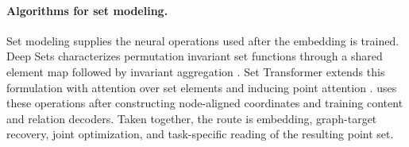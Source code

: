\paragraph{Algorithms for set modeling.}
Set modeling supplies the neural operations used after the embedding is trained.
Deep Sets characterizes permutation invariant set functions through a shared
element map followed by invariant aggregation \cite{zaheer2017}.  Set
Transformer extends this formulation with attention over set elements and
inducing point attention \cite{lee2019}.  \method{} uses these operations after
constructing node-aligned coordinates and training content and relation
decoders.  Taken together, the route is embedding, graph-target recovery,
joint optimization, and task-specific reading of the resulting point set.
